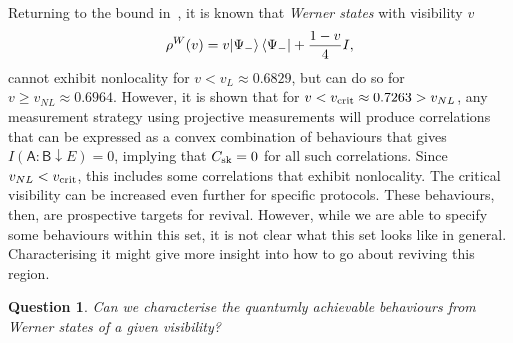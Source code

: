 \documentclass[10pt, a4paper]{article}
\numberwithin{equation}{section} %
\theoremstyle{definition}
\theoremstyle{plain}
\newtheorem{question}{Question}
\newcommand{\?}{\mathrel{?}} %
\newcommand{\crv}[1]{\mathsf{#1}}
\newcommand{\sk}{\rm sk}
\newcommand{\crit}{\rm crit}
\begin{document}
      Returning to the bound in~\cite{NotSufficient}, it is known that \emph{Werner states} with visibility \(v\)
      \begin{equation}
        \rho^{W}(v) = v{\ket{\Psi_-}\bra{\Psi_-}} + \frac{1-v}{4}I,
      \end{equation}
      cannot exhibit nonlocality for \(v < v_L \approx 0.6829\), but can do so for \(v \geq v_{NL} \approx 0.6964\). However, it is shown that for \(v < v_{\crit} \approx 0.7263 > v_{NL}\), any measurement strategy using projective measurements will produce correlations that can be expressed as a convex combination of behaviours that gives \(I(\crv{A}:\crv{B} \downarrow E) = 0\), implying that \(C_{\sk} = 0\) for all such correlations. Since \(v_{NL} < v_{\crit}\), this includes some correlations that exhibit nonlocality. The critical visibility can be increased even further for specific protocols. These behaviours, then, are prospective targets for revival. However, while we are able to specify some behaviours within this set, it is not clear what this set looks like in general. Characterising it might give more insight into how to go about reviving this region.

      \begin{question}
        Can we characterise the quantumly achievable behaviours from Werner states of a given visibility?
      \end{question}
\end{document}
